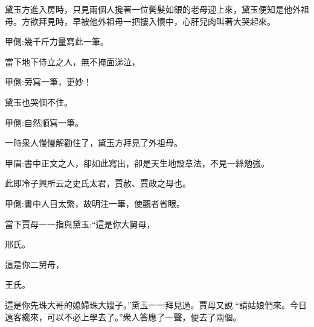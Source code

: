 \begin{parag}
    黛玉方進入房時，只見兩個人攙著一位鬢髮如銀的老母迎上來，黛玉便知是他外祖母。方欲拜見時，早被他外祖母一把摟入懷中，心肝兒肉叫著大哭起來。\begin{note}甲側:幾千斤力量寫此一筆。\end{note}當下地下侍立之人，無不掩面涕泣，\begin{note}甲側:旁寫一筆，更妙！\end{note}黛玉也哭個不住。\begin{note}甲側:自然順寫一筆。\end{note}一時衆人慢慢解勸住了，黛玉方拜見了外祖母。\begin{note}甲眉:書中正文之人，卻如此寫出，卻是天生地設章法，不見一絲勉強。\end{note}此即冷子興所云之史氏太君，賈赦、賈政之母也。\begin{note}甲側:書中人目太繁，故明注一筆，使觀者省眼。\end{note}當下賈母一一指與黛玉:“這是你大舅母，\begin{note}邢氏。\end{note}這是你二舅母，\begin{note}王氏。\end{note}這是你先珠大哥的媳婦珠大嫂子。”黛玉一一拜見過。賈母又說:“請姑娘們來。今日遠客纔來，可以不必上學去了。”衆人答應了一聲，便去了兩個。
\end{parag}


